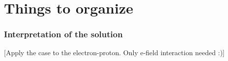 \chapter{Things to organize}


\subsection{Interpretation of the solution}
%
[Apply the case to the electron-proton. Only e-field interaction needed :)]



